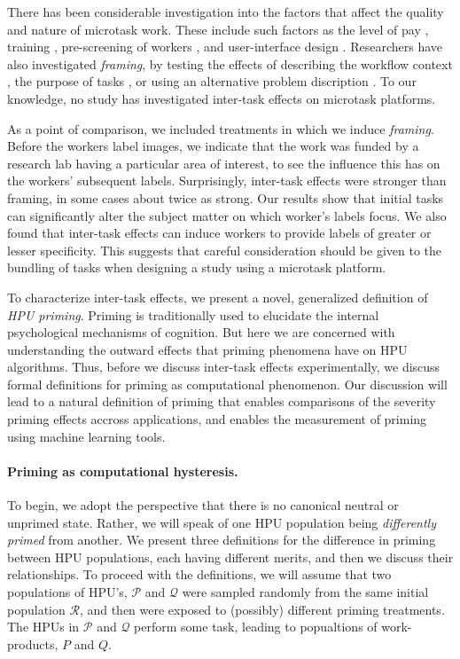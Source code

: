 \documentclass[12pt]{article}
\begin{document}
There has been considerable investigation into the factors that affect the 
quality and nature of microtask work.  These include such factors as the 
level of 
pay \cite{kazai2013analysis}, training \cite{le2010ensuring}, pre-screening of 
workers \cite{paolacci2010running}, and user-interface design 
\cite{Finnerty2013}.  Researchers have also investigated \textit{framing}, 
by testing the effects of describing the workflow context 
\cite{Kinnaird2012281}, the purpose of tasks 
\cite{chandler2013breaking}, or using an alternative problem discription
\cite{thibodeau2013natural}.  To our knowledge, no study has investigated 
inter-task effects on microtask platforms.

As a point of comparison, we included treatments in which we induce 
\textit{framing}.
Before the workers label images, we indicate that the work 
was funded by a research lab having a particular area of interest, to see the 
influence this has on the workers’ subsequent labels. 
Surprisingly, inter-task effects were stronger than framing, in some cases 
about twice as strong. 
Our results show that initial tasks can significantly alter the subject 
matter on which worker's labels focus. We also found that inter-task 
effects can induce workers to provide labels of greater or lesser specificity. 
This suggests that careful consideration should be given to the bundling of 
tasks when designing a study using a microtask platform.

To characterize inter-task effects, we present a novel, generalized definition 
of \textit{HPU priming}. Priming is traditionally used to elucidate the
internal psychological mechanisms of cognition.  But here we are concerned with
understanding the outward effects that priming phenomena have on HPU 
algorithms. Thus, before we discuss inter-task effects experimentally, we 
discuss formal definitions for priming as computational phenomenon.  Our
discussion will lead to a natural definition of priming that enables 
comparisons of the severity priming effects accross applications, and enables
the measurement of priming using machine learning tools.

\paragraph*{Priming as computational hysteresis.}
To begin, we adopt the perspective that there is no canonical neutral or
unprimed state.  Rather, we will speak of one HPU population being 
\textit{differently primed} from another.  We present three definitions for 
the difference in priming between HPU populations, each having different 
merits, and then we discuss their relationships. To proceed with the 
definitions, we will assume that two populations of HPU’s, $\mathcal{P}$ and 
$\mathcal{Q}$ were 
sampled randomly from the same initial population $\mathcal{R}$, and then were 
exposed to (possibly) different priming treatments. The HPUs in $\mathcal{P}$ 
and $\mathcal{Q}$ perform some task, leading to popualtions of work-products, 
$P$ and $Q$.
\end{document}
